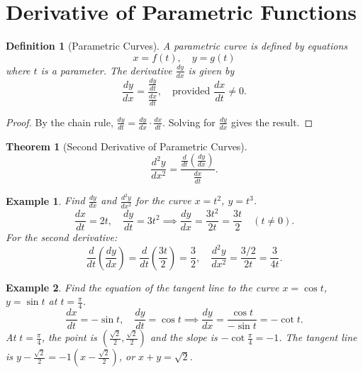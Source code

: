 \documentclass[11pt,a4paper]{article}
\newtheorem{example}{Example}
\newtheorem{theorem}{Theorem}
\newtheorem{definition}{Definition}
\begin{document}
\section{Derivative of Parametric Functions}
\begin{definition}[Parametric Curves]
A \textit{parametric curve} is defined by equations
\[
x = f(t), \quad y = g(t)
\]
where $t$ is a parameter. The derivative $\frac{dy}{dx}$ is given by
\[
\frac{dy}{dx} = \frac{\frac{dy}{dt}}{\frac{dx}{dt}}, \quad \text{provided } \frac{dx}{dt} \neq 0.
\]
\end{definition}
\begin{proof}
By the chain rule, $\frac{dy}{dt} = \frac{dy}{dx} \cdot \frac{dx}{dt}$. Solving for $\frac{dy}{dx}$ gives the result.
\end{proof}
\begin{theorem}[Second Derivative of Parametric Curves]
\[
\frac{d^2y}{dx^2} = \frac{\frac{d}{dt} \left( \frac{dy}{dx} \right)}{\frac{dx}{dt}}.
\]
\end{theorem}
\begin{example}
Find $\frac{dy}{dx}$ and $\frac{d^2y}{dx^2}$ for the curve $x = t^2$, $y = t^3$.
\[
\frac{dx}{dt} = 2t, \quad \frac{dy}{dt} = 3t^2 \implies \frac{dy}{dx} = \frac{3t^2}{2t} = \frac{3t}{2} \quad (t \neq 0).
\]
For the second derivative:
\[
\frac{d}{dt} \left( \frac{dy}{dx} \right) = \frac{d}{dt} \left( \frac{3t}{2} \right) = \frac{3}{2}, \quad \frac{d^2y}{dx^2} = \frac{3/2}{2t} = \frac{3}{4t}.
\]
\end{example}
\begin{example}
Find the equation of the tangent line to the curve $x = \cos t$, $y = \sin t$ at $t = \frac{\pi}{4}$.
\[
\frac{dx}{dt} = -\sin t, \quad \frac{dy}{dt} = \cos t \implies \frac{dy}{dx} = \frac{\cos t}{-\sin t} = -\cot t.
\]
At $t = \frac{\pi}{4}$, the point is $\left( \frac{\sqrt{2}}{2}, \frac{\sqrt{2}}{2} \right)$ and the slope is $-\cot \frac{\pi}{4} = -1$.
The tangent line is $y - \frac{\sqrt{2}}{2} = -1 \left( x - \frac{\sqrt{2}}{2} \right)$, or $x + y = \sqrt{2}$.
\end{example}
\end{document}
